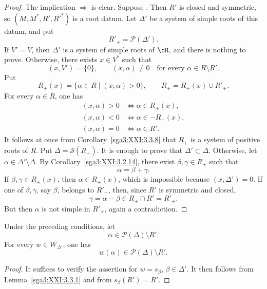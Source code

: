 \begin{proof}
The implication  \(\Rightarrow\)  is clear. Suppose .
Then \(R'\) is closed and symmetric, so
\((M,M^\ast,R',R'^\ast)\) is a root datum. Let \(\Delta'\) be a
system of simple roots of this datum, and put
\[
 R'_+=\mathscr{P}(\Delta').
\]
If \(V'=V\), then \(\Delta'\) is a system of simple roots of
\(\cR\), and there is nothing to prove. Otherwise, there exists
\(x\in V^\ast\) such that
\[
 (x,V')=\{0\},
 \qquad
 (x,\alpha)\ne0
 \quad\text{for every }\alpha\in R\setminus R'.
\]
Put
\[
 R_+(x)=\{\alpha\in R\mid(x,\alpha)>0\},
 \qquad
 R_+=R_+(x)\cup R'_+.
\]
For every \(\alpha\in R\), one has
\[
\begin{aligned}
 (x,\alpha)>0 &\Longleftrightarrow \alpha\in R_+(x),\\
 (x,\alpha)<0 &\Longleftrightarrow \alpha\in-R_+(x),\\
 (x,\alpha)=0 &\Longleftrightarrow \alpha\in R'.
\end{aligned}
\]
It follows at once from Corollary~\ref{sga3:XXI:3.3.8} that \(R_+\)
is a system of positive roots of \(R\). Put
\(\Delta=\mathscr{S}(R_+)\). It is enough to prove that
\(\Delta'\subset\Delta\). Otherwise, let
\(\alpha\in\Delta'\setminus\Delta\). By
Corollary~\ref{sga3:XXI:3.2.14}, there exist
\(\beta,\gamma\in R_+\) such that
\[
 \alpha=\beta+\gamma.
\]
If \(\beta,\gamma\in R_+(x)\), then \(\alpha\in R_+(x)\), which is
impossible because \((x,\Delta')=0\). If one of \(\beta,\gamma\),
say \(\beta\), belongs to \(R'_+\), then, since \(R'\) is symmetric
and closed,
\[
 \gamma=\alpha-\beta\in R_+\cap R'=R'_+.
\]
But then \(\alpha\) is not simple in \(R'_+\), again a
contradiction.
\end{proof}

\begin{lemma}\label{sga3:XXI:3.4.9}
Under the preceding conditions, let
\[
 \alpha\in\mathscr{P}(\Delta)\setminus R'.
\]
For every \(w\in W_{\Delta'}\), one has
\[
 w(\alpha)\in\mathscr{P}(\Delta)\setminus R'.
\]
\end{lemma}

\begin{proof}
It suffices to verify the assertion for
\(w=s_\beta\), \(\beta\in\Delta'\). It then follows from
Lemma~\ref{sga3:XXI:3.3.1} and from
\(s_\beta(R')=R'\).
\end{proof}


